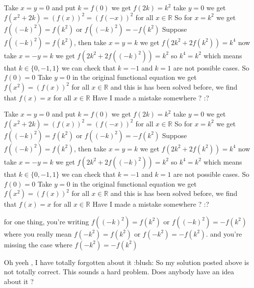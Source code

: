 \begin{solution}
	Take $x=y=0$ and put $k=f(0)$ we get $f(2k)=k^2$
take $y=0$ we get $f(x^2+2k)=(f(x))^2=(f(-x))^2$ for all $x \in \mathbb R$
So for $x=k^2$ we get $f((-k)^2)=f(k^2)$ or $f((-k)^2)=-f(k^2)$
Suppose $f((-k)^2)=f(k^2)$, then take $x=y=k$ we get $f(2k^2+2f(k^2))=k^4$
now take $x=-y=k$ we get $f(2k^2+2f((-k)^2))=k^2$
so $k^4=k^2$ which means that $k \in \{0,-1,1\}$
we can check that $k=-1$ and $k=1$ are not possible cases.
So $f(0)=0$
Take $y=0$ in the original functional equation we get $f(x^2)=(f(x))^2$ for all $x \in \mathbb R$
and this is has been solved before, we find that $f(x)=x$ for all $x \in \mathbb R$
Have I made a mistake somewhere ? :?
\end{solution}



\begin{solution}
	\begin{tcolorbox}Take $x=y=0$ and put $k=f(0)$ we get $f(2k)=k^2$
take $y=0$ we get $f(x^2+2k)=(f(x))^2=(f(-x))^2$ for all $x \in \mathbb R$
So for $x=k^2$ we get $f((-k)^2)=f(k^2)$ or $f((-k)^2)=-f(k^2)$
Suppose $f((-k)^2)=f(k^2)$, then take $x=y=k$ we get $f(2k^2+2f(k^2))=k^4$
now take $x=-y=k$ we get $f(2k^2+2f((-k)^2))=k^2$
so $k^4=k^2$ which means that $k \in \{0,-1,1\}$
we can check that $k=-1$ and $k=1$ are not possible cases.
So $f(0)=0$
Take $y=0$ in the original functional equation we get $f(x^2)=(f(x))^2$ for all $x \in \mathbb R$
and this is has been solved before, we find that $f(x)=x$ for all $x \in \mathbb R$
Have I made a mistake somewhere ? :?\end{tcolorbox}

for one thing, you're writing $ f((-k)^2) = f(k^2) $ or $ f((-k)^2) = -f(k^2) $ where you really mean $ f(-k^2) = f(k^2) $ or $ f(-k^2) = -f(k^2) $.  and you're missing the case where $ f(-k^2) = -f(k^2) $
\end{solution}



\begin{solution}
	Oh yeeh , I have totally forgotten about it  :blush:
So my solution posted above is not totally correct. This sounds a hard problem. Does anybody have an idea about it ?
\end{solution}



